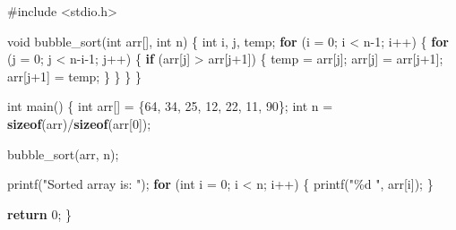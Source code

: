 \documentclass[
  letterpaper,
  DIV=11,
  numbers=noendperiod]{scrreprt}
\newenvironment{Shaded}{\begin{snugshade}}{\end{snugshade}}
\newcommand{\ControlFlowTok}[1]{\textcolor[rgb]{0.00,0.23,0.31}{\textbf{#1}}}
\newcommand{\DataTypeTok}[1]{\textcolor[rgb]{0.68,0.00,0.00}{#1}}
\newcommand{\DecValTok}[1]{\textcolor[rgb]{0.68,0.00,0.00}{#1}}
\newcommand{\ImportTok}[1]{\textcolor[rgb]{0.00,0.46,0.62}{#1}}
\newcommand{\KeywordTok}[1]{\textcolor[rgb]{0.00,0.23,0.31}{\textbf{#1}}}
\newcommand{\NormalTok}[1]{\textcolor[rgb]{0.00,0.23,0.31}{#1}}
\newcommand{\OperatorTok}[1]{\textcolor[rgb]{0.37,0.37,0.37}{#1}}
\newcommand{\PreprocessorTok}[1]{\textcolor[rgb]{0.68,0.00,0.00}{#1}}
\newcommand{\SpecialCharTok}[1]{\textcolor[rgb]{0.37,0.37,0.37}{#1}}
\newcommand{\StringTok}[1]{\textcolor[rgb]{0.13,0.47,0.30}{#1}}
\begin{document}
\begin{Shaded}
\begin{Highlighting}[]
\PreprocessorTok{\#include }\ImportTok{\textless{}stdio.h\textgreater{}}

\DataTypeTok{void}\NormalTok{ bubble\_sort}\OperatorTok{(}\DataTypeTok{int}\NormalTok{ arr}\OperatorTok{[],} \DataTypeTok{int}\NormalTok{ n}\OperatorTok{)} \OperatorTok{\{}
    \DataTypeTok{int}\NormalTok{ i}\OperatorTok{,}\NormalTok{ j}\OperatorTok{,}\NormalTok{ temp}\OperatorTok{;}
    \ControlFlowTok{for} \OperatorTok{(}\NormalTok{i }\OperatorTok{=} \DecValTok{0}\OperatorTok{;}\NormalTok{ i }\OperatorTok{\textless{}}\NormalTok{ n}\OperatorTok{{-}}\DecValTok{1}\OperatorTok{;}\NormalTok{ i}\OperatorTok{++)} \OperatorTok{\{}
        \ControlFlowTok{for} \OperatorTok{(}\NormalTok{j }\OperatorTok{=} \DecValTok{0}\OperatorTok{;}\NormalTok{ j }\OperatorTok{\textless{}}\NormalTok{ n}\OperatorTok{{-}}\NormalTok{i}\OperatorTok{{-}}\DecValTok{1}\OperatorTok{;}\NormalTok{ j}\OperatorTok{++)} \OperatorTok{\{}
            \ControlFlowTok{if} \OperatorTok{(}\NormalTok{arr}\OperatorTok{[}\NormalTok{j}\OperatorTok{]} \OperatorTok{\textgreater{}}\NormalTok{ arr}\OperatorTok{[}\NormalTok{j}\OperatorTok{+}\DecValTok{1}\OperatorTok{])} \OperatorTok{\{}
\NormalTok{                temp }\OperatorTok{=}\NormalTok{ arr}\OperatorTok{[}\NormalTok{j}\OperatorTok{];}
\NormalTok{                arr}\OperatorTok{[}\NormalTok{j}\OperatorTok{]} \OperatorTok{=}\NormalTok{ arr}\OperatorTok{[}\NormalTok{j}\OperatorTok{+}\DecValTok{1}\OperatorTok{];}
\NormalTok{                arr}\OperatorTok{[}\NormalTok{j}\OperatorTok{+}\DecValTok{1}\OperatorTok{]} \OperatorTok{=}\NormalTok{ temp}\OperatorTok{;}
            \OperatorTok{\}}
        \OperatorTok{\}}
    \OperatorTok{\}}
\OperatorTok{\}}

\DataTypeTok{int}\NormalTok{ main}\OperatorTok{()} \OperatorTok{\{}
    \DataTypeTok{int}\NormalTok{ arr}\OperatorTok{[]} \OperatorTok{=} \OperatorTok{\{}\DecValTok{64}\OperatorTok{,} \DecValTok{34}\OperatorTok{,} \DecValTok{25}\OperatorTok{,} \DecValTok{12}\OperatorTok{,} \DecValTok{22}\OperatorTok{,} \DecValTok{11}\OperatorTok{,} \DecValTok{90}\OperatorTok{\};}
    \DataTypeTok{int}\NormalTok{ n }\OperatorTok{=} \KeywordTok{sizeof}\OperatorTok{(}\NormalTok{arr}\OperatorTok{)/}\KeywordTok{sizeof}\OperatorTok{(}\NormalTok{arr}\OperatorTok{[}\DecValTok{0}\OperatorTok{]);}

\NormalTok{    bubble\_sort}\OperatorTok{(}\NormalTok{arr}\OperatorTok{,}\NormalTok{ n}\OperatorTok{);}

\NormalTok{    printf}\OperatorTok{(}\StringTok{"Sorted array is: "}\OperatorTok{);}
    \ControlFlowTok{for} \OperatorTok{(}\DataTypeTok{int}\NormalTok{ i }\OperatorTok{=} \DecValTok{0}\OperatorTok{;}\NormalTok{ i }\OperatorTok{\textless{}}\NormalTok{ n}\OperatorTok{;}\NormalTok{ i}\OperatorTok{++)} \OperatorTok{\{}
\NormalTok{        printf}\OperatorTok{(}\StringTok{"}\SpecialCharTok{\%d}\StringTok{ "}\OperatorTok{,}\NormalTok{ arr}\OperatorTok{[}\NormalTok{i}\OperatorTok{]);}
    \OperatorTok{\}}

    \ControlFlowTok{return} \DecValTok{0}\OperatorTok{;}
\OperatorTok{\}}
\end{Highlighting}
\end{Shaded}
\end{document}
